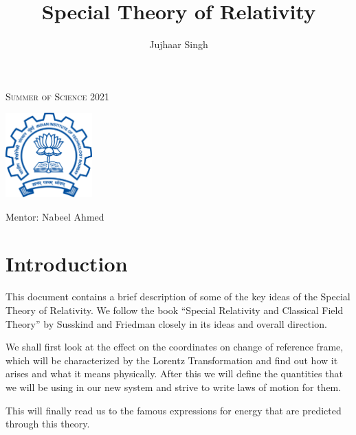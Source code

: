 \documentclass[16pt]{scrartcl}
\title{Special Theory of Relativity}
\author{
    Jujhaar Singh
}
\date{}
\numberwithin{equation}{section}
\theoremstyle{plain}
\theoremstyle{definition}
\newcommand{\myfont}{\fontfamily{cmss}\selectfont}
\newcommand{\myfontb}[1]{\textbf{\myfont #1}}
\begin{document}


\pagebreak

\begin{titlepage}
    \centering
    {\scshape\LARGE Summer of Science 2021 \par}
    \vspace{1.5cm}
    \includegraphics[width = 0.25\textwidth]
    {img/iitb_logo}\par
    \vspace{1cm}
    {\Huge \myfontb \@title \par}
    \vspace{3cm}
    {\Large\myfont
        \@author \par
        \large
        Mentor: Nabeel Ahmed
        \vfill
        {\large \@date \par}
    }\end{titlepage}

\pagebreak
\thispagestyle{empty}
\tableofcontents
\pagebreak

\setcounter{page}{1}


\section*{Introduction}
This document contains a brief description of some of the key ideas of the Special Theory of Relativity. We follow the book ``Special Relativity and Classical Field Theory'' by Susskind and Friedman closely in its ideas and overall direction.

We shall first look at the effect on the coordinates on change of reference frame, which will be characterized by the Lorentz Transformation and find out how it arises and what it means physically. After this we will define the quantities that we will be using in our new system and strive to write laws of motion for them. 

This will finally read us to the famous expressions for energy that are predicted through this theory.
\end{document}
